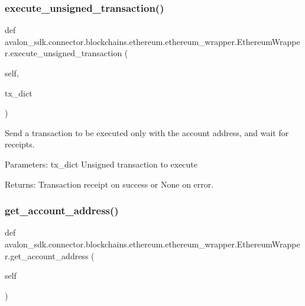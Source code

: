 \subsubsection{\texorpdfstring{execute\+\_\+unsigned\+\_\+transaction()}{execute\_unsigned\_transaction()}}
{\footnotesize\ttfamily def avalon\+\_\+sdk.\+connector.\+blockchains.\+ethereum.\+ethereum\+\_\+wrapper.\+Ethereum\+Wrapper.\+execute\+\_\+unsigned\+\_\+transaction (\begin{DoxyParamCaption}\item[{}]{self,  }\item[{}]{tx\+\_\+dict }\end{DoxyParamCaption})}

\begin{DoxyVerb}Send a transaction to be executed only with the account address,
and wait for receipts.

Parameters:
tx_dict     Unsigned transaction to execute

Returns:
Transaction receipt on success or None on error.
\end{DoxyVerb}
 \mbox{\label{classavalon__sdk_1_1connector_1_1blockchains_1_1ethereum_1_1ethereum__wrapper_1_1EthereumWrapper_a838787247384ef53a68e557be4e537fd}} 
\subsubsection{\texorpdfstring{get\+\_\+account\+\_\+address()}{get\_account\_address()}}
{\footnotesize\ttfamily def avalon\+\_\+sdk.\+connector.\+blockchains.\+ethereum.\+ethereum\+\_\+wrapper.\+Ethereum\+Wrapper.\+get\+\_\+account\+\_\+address (\begin{DoxyParamCaption}\item[{}]{self }\end{DoxyParamCaption})}

